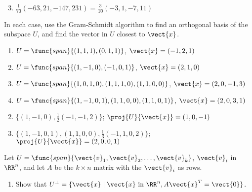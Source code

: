 \begin{multicols}{2}
\begin{ex}
\begin{sol}
\begin{enumerate}[label={\alph*.}]
\setcounter{enumi}{2}
\item  $\frac{1}{70}(-63,21,-147,231) = \frac{3}{10}(-3,1,-7,11)$

\end{enumerate}
\end{sol}
\end{ex}

\begin{ex}
In each case, use the Gram-Schmidt algorithm to find an orthogonal basis of the subspace $U$, and find the vector in $U$ closest to $\vect{x}$.

\begin{enumerate}[label={\alph*.}]
\item $U = \func{span}\{(1, 1, 1), (0, 1, 1)\}$, $\vect{x} = (-1, 2, 1)$

\item $U = \func{span}\{(1, -1, 0), (-1, 0, 1)\}$, $\vect{x} = (2, 1, 0)$

\item $U = \func{span}\{(1, 0, 1, 0), (1, 1, 1, 0), (1, 1, 0, 0)\}$, $\vect{x} = (2, 0, -1, 3)$

\item $U = \func{span}\{(1, -1, 0, 1), (1, 1, 0, 0), (1, 1, 0, 1)\}$, $\vect{x} = (2, 0, 3, 1)$

\end{enumerate}
\begin{sol}
\begin{enumerate}[label={\alph*.}]
\setcounter{enumi}{1}
\item  $\{(1, -1, 0), \frac{1}{2}(-1, -1, 2)\}$; $\proj{U}{\vect{x}} = (1, 0, -1)$

\setcounter{enumi}{3}
\item $\{(1, -1, 0, 1), (1, 1, 0, 0), \frac{1}{3}(-1, 1, 0, 2)\}$; $\proj{U}{\vect{x}} = (2, 0, 0, 1)$

\end{enumerate}
\end{sol}
\end{ex}

\begin{ex}
Let $U = \func{span}\{\vect{v}_{1}, \vect{v}_{2}, \dots, \vect{v}_{k}\}$, $\vect{v}_{i}$ in $\RR^n$, and let $A$ be the $k \times n$ matrix with the $\vect{v}_{i}$ as rows.


\begin{enumerate}[label={\alph*.}]
\item Show that $U^\perp = \{\vect{x} \mid  \vect{x} \mbox{ in } \RR^n, A\vect{x}^{T} = \vect{0}\}$.


\end{enumerate}
\end{ex}
\end{multicols}
